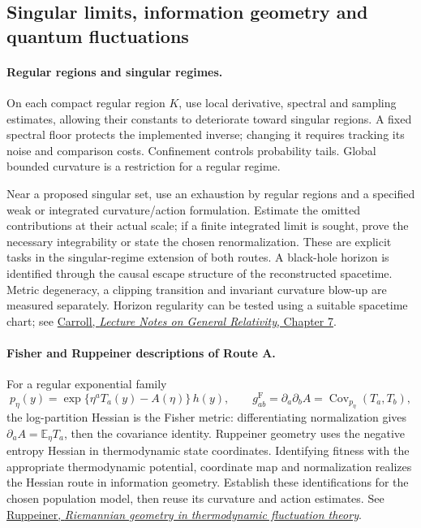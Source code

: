 \documentclass[11pt,a4paper]{article}
\begin{document}
\clearpage
\subsection{Singular limits, information geometry and quantum fluctuations}

\paragraph{Regular regions and singular regimes.}
On each compact regular region $K$, use local derivative, spectral and sampling
estimates, allowing their constants to deteriorate toward singular regions.
A fixed spectral floor protects the implemented inverse; changing it requires
tracking its noise and comparison costs. Confinement controls probability tails.
Global bounded curvature is a restriction for a regular regime.

Near a proposed singular set, use an exhaustion by regular regions and a
specified weak or integrated curvature/action formulation. Estimate the omitted
contributions at their actual scale; if a finite integrated limit is sought,
prove the necessary integrability or state the chosen renormalization.
These are explicit tasks in the singular-regime extension of both routes.
A black-hole horizon is identified through the causal escape structure of the
reconstructed spacetime. Metric degeneracy, a clipping transition and invariant
curvature blow-up are measured separately. Horizon regularity can be tested
using a suitable spacetime chart; see
\href{https://vo.ned.ipac.caltech.edu/level5/March01/Carroll3/Carroll7.html}{Carroll, \emph{Lecture Notes on General Relativity}, Chapter 7}.

\paragraph{Fisher and Ruppeiner descriptions of Route A.}
For a regular exponential family
\[
p_\eta(y)=\exp\{\eta^aT_a(y)-A(\eta)\}\,h(y),\qquad
g^{\mathrm F}_{ab}=\partial_a\partial_bA
 =\operatorname{Cov}_{p_\eta}(T_a,T_b),
\]
the log-partition Hessian is the Fisher metric: differentiating normalization
gives $\partial_aA=\mathbb E_\eta T_a$, then the covariance identity.
Ruppeiner geometry uses the negative entropy Hessian in thermodynamic state
coordinates. Identifying fitness with the appropriate thermodynamic potential,
coordinate map and normalization realizes the Hessian route in information
geometry. Establish these identifications for the chosen population model,
then reuse its curvature and action estimates. See
\href{https://doi.org/10.1103/RevModPhys.67.605}{Ruppeiner, \emph{Riemannian geometry in thermodynamic fluctuation theory}}.
\end{document}
